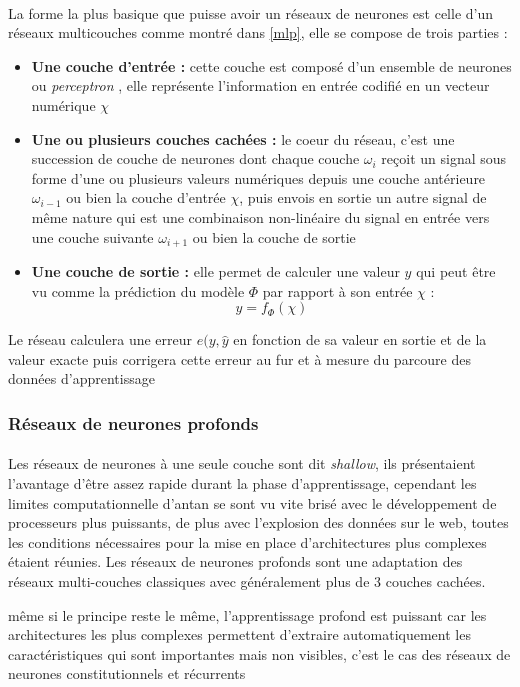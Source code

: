 		\paragraph{}
		La forme la plus basique que puisse avoir un réseaux de neurones est celle d'un réseaux multicouches comme montré dans \ref{mlp}, elle se compose de trois parties :
		\begin{itemize}
			\item \textbf{Une couche d'entrée : } cette couche est composé d'un ensemble de neurones ou \textit{perceptron} \cite{perceptron}, elle représente l'information en entrée codifié en un vecteur numérique $\chi$
			
			\item  \textbf{Une ou plusieurs couches cachées :} le coeur du réseau, c'est une succession de couche de neurones dont chaque couche $\omega_i$ reçoit un signal sous forme d'une ou plusieurs valeurs numériques depuis une couche antérieure $\omega_{i-1}$ ou bien la couche d'entrée $\chi$, puis envois en sortie  un autre signal de même nature qui est une combinaison non-linéaire du signal en entrée vers une couche suivante $\omega_{i+1}$ ou bien la couche de sortie
			\item \textbf{Une couche de sortie :}
			elle permet de calculer une valeur $y$ qui peut être vu comme la prédiction du modèle $\Phi$ par rapport à son entrée $\chi$ : 
			\begin{equation}
				y = f_\Phi(\chi)
			\end{equation}
		\end{itemize}
		Le réseau calculera une erreur $e(y,\hat{y}$ en fonction de sa valeur en sortie et de la valeur exacte puis corrigera cette erreur au fur et à mesure du parcoure des données d'apprentissage \cite{mlp}
		
		\subsubsection{Réseaux de neurones profonds}
		\paragraph{}
		Les réseaux de neurones à une seule couche sont dit \textit{shallow}, ils présentaient l'avantage d'être assez rapide durant la phase d'apprentissage, cependant les limites computationnelle d'antan se sont vu vite brisé avec le développement de processeurs plus puissants, de plus avec l'explosion des données sur le web, toutes les conditions nécessaires pour la mise en place d'architectures plus complexes étaient réunies. Les réseaux de neurones profonds sont une adaptation des réseaux multi-couches classiques avec généralement plus de 3 couches cachées. \par même si le principe reste le même, l'apprentissage profond est puissant car les architectures les plus complexes permettent d'extraire automatiquement les caractéristiques qui sont importantes mais non visibles, c'est le cas des réseaux de neurones constitutionnels et récurrents \cite{dnn} 
		
